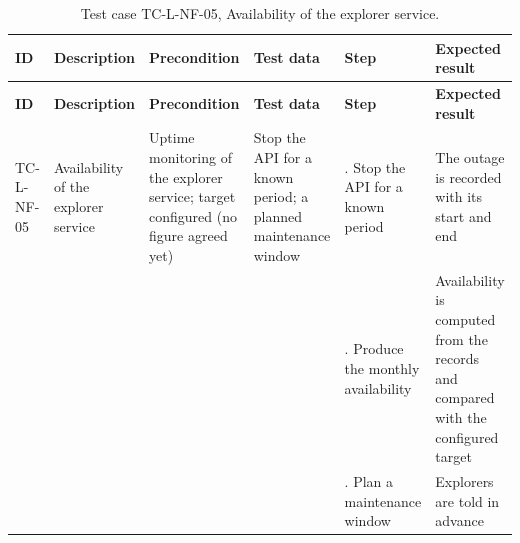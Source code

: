 {\footnotesize{}\renewcommand{\arraystretch}{1.1}
\begin{longtable}{|>{\raggedright\arraybackslash}p{}|>{\raggedright\arraybackslash}p{}|>{\raggedright\arraybackslash}p{}|>{\raggedright\arraybackslash}p{}|>{\raggedright\arraybackslash}p{}|>{\raggedright\arraybackslash}p{}|}
\caption{Test case TC-L-NF-05, Availability of the explorer service.} \\
\hline
\textbf{ID} & \textbf{Description} & \textbf{Precondition} & \textbf{Test data} & \textbf{Step} & \textbf{Expected result} \\ \hline
\endfirsthead
\hline
\textbf{ID} & \textbf{Description} & \textbf{Precondition} & \textbf{Test data} & \textbf{Step} & \textbf{Expected result} \\ \hline
\endhead
TC-L-NF-05 & Availability of the explorer service & Uptime monitoring of the explorer service; target configured (no figure agreed yet) & Stop the API for a known period; a planned maintenance window & 1. Stop the API for a known period & The outage is recorded with its start and end \\ \cline{5-6}
 &  &  &  & 2. Produce the monthly availability & Availability is computed from the records and compared with the configured target \\ \cline{5-6}
 &  &  &  & 3. Plan a maintenance window & Explorers are told in advance \\ \hline
\end{longtable}
}

